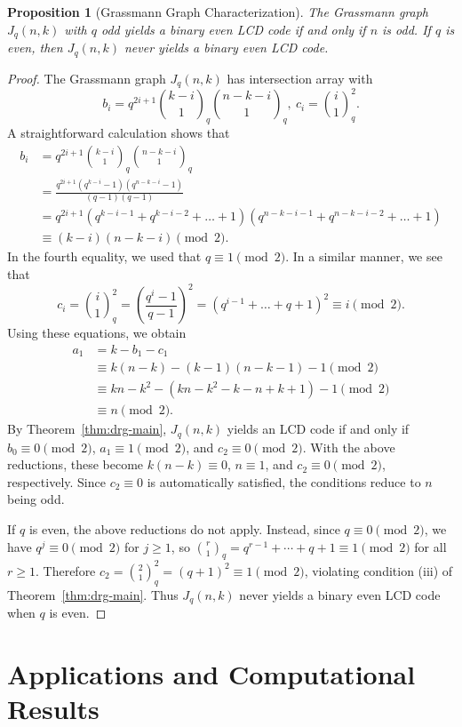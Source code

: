 \documentclass[a4paper,11pt]{article}
\newtheorem{proposition}[theorem]{Proposition}
\theoremstyle{remark}
\begin{document}
\begin{proposition}[Grassmann Graph Characterization]
The Grassmann graph $J_q(n,k)$ with $q$ odd yields a binary even LCD code if and only if $n$ is odd. If $q$ is even, then $J_q(n,k)$ never yields a binary even LCD code.
\end{proposition}
\begin{proof}
The Grassmann graph $J_q(n,k)$ has intersection array with
$$
b_i = q^{2i+1}\binom{k-i}{1}_q \binom{n-k-i}{1}_q,\ c_i = \binom{i}{1}_q^2.
$$
A straightforward calculation shows that
\begin{align*}
b_i
&= q^{2i+1} \binom{k-i}{1}_q \binom{n-k-i}{1}_q\\
&= \frac{q^{2i+1}(q^{k-i}-1)(q^{n-k-i}-1)}{(q-1)(q-1)}\\
&= q^{2i+1} (q^{k-i-1}+q^{k-i-2}+\dots+1)(q^{n-k-i-1}+q^{n-k-i-2}+\dots+1)\\
&\equiv (k-i)(n-k-i) \pmod 2.
\end{align*}
In the fourth equality, we used that $q \equiv 1 \pmod 2$.
In a similar manner, we see that
$$
c_i
= \binom{i}{1}_q^2
= (\frac{q^i-1}{q-1})^2
= (q^{i-1}+ \dots + q+1)^2
\equiv i \pmod 2.
$$
Using these equations, we obtain
\begin{align*}   
a_1
&= k - b_1 - c_1\\
&\equiv k(n-k) - (k-1)(n-k-1) - 1 \pmod 2\\
&\equiv kn - k^2 - (kn - k^2 - k - n + k + 1) - 1 \pmod 2\\
&\equiv n \pmod 2.
\end{align*}
By Theorem~\ref{thm:drg-main}, $J_q(n,k)$ yields an LCD code if and only if $b_0 \equiv 0 \pmod 2$, $a_1 \equiv 1 \pmod 2$, and $c_2 \equiv 0 \pmod 2$. With the above reductions, these become $k(n-k) \equiv 0$, $n \equiv 1$, and $c_2 \equiv 0 \pmod 2$, respectively. Since $c_2 \equiv 0$ is automatically satisfied, the conditions reduce to $n$ being odd.

If $q$ is even, the above reductions do not apply.
Instead, since $q \equiv 0 \pmod 2$, we have $q^j \equiv 0 \pmod 2$ for $j \geq 1$, so $\binom{r}{1}_q = q^{r-1}+\cdots+q+1 \equiv 1 \pmod 2$ for all $r \geq 1$. Therefore $c_2 = \binom{2}{1}_q^2 = (q+1)^2 \equiv 1 \pmod 2$, violating condition (iii) of Theorem~\ref{thm:drg-main}. Thus $J_q(n,k)$ never yields a binary even LCD code when $q$ is even.
\end{proof}


\section{Applications and Computational Results}\label{sec:applications}
\end{document}

